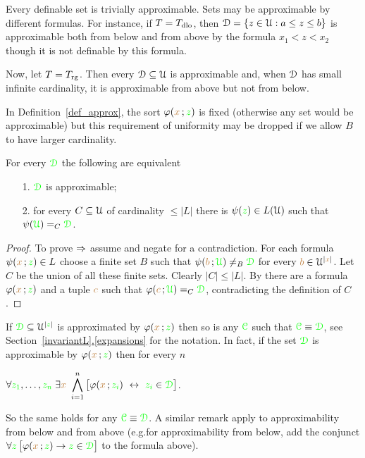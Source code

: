 \documentclass[creche.tex]{subfiles}
\begin{document}
\begin{example}
Every definable set is trivially approximable.
Sets may be approximable by different formulas.
For instance, if $T=T_{\rm dlo}$, then $\EuScript D=\{z\in\EuScript U:a\le z\le b\}$ is approximable both from below and from above by the formula $x_1<z<x_2$ though it is not definable by this formula.

Now, let $T=T_{\rm rg}$.
Then every $\EuScript D\subseteq\EuScript U$ is approximable and, when $\EuScript D$ has small infinite cardinality, it is approximable from above but not from below.\QED
\end{example}

In Definition~\ref{def_approx}, the sort $\varphi({\color{brown} x}\,;{\color{green} z})$ is fixed (otherwise any set would be approximable) but this requirement of uniformity may be dropped if we allow $B$ to have larger cardinality.

\begin{proposition}\label{lem_approx_nonunif}
For every ${\color{green}\EuScript D}$ the following are equivalent
\begin{itemize}
\item[1.] ${\color{green}\EuScript D}$ is approximable;
\item[2.] for every $C\subseteq\EuScript U$ of cardinality $\le|L|$ there is $\psi({\color{green} z})\in L(\EuScript U)$ such that $\psi({\color{green}\EuScript U})=_C{\color{green}\EuScript D}$.
\end{itemize}
\end{proposition}

\begin{proof}
To prove $\Rightarrow$ assume  and negate  for a contradiction.
For each formula $\psi({\color{brown} x}\,;{\color{green} z})\in L$ choose a finite set $B$ such that $\psi({\color{brown} b}\,;{\color{green}\EuScript U})\neq_B{\color{green}\EuScript D}$ for every ${\color{brown} b}\in\EuScript U^{|{\color{brown} x}|}$.
Let $C$ be the union of all these finite sets.
Clearly $|C|\le|L|$.
By  there are a formula $\varphi({\color{brown} x}\,;{\color{green} z})$ and a tuple ${\color{brown} c}$ such that $\varphi({\color{brown} c}\,;{\color{green}\EuScript U})=_C{\color{green}\EuScript D}$, contradicting the definition of $C$.
\end{proof}



\begin{remark}\label{prop_approx_el_eq}
If ${\color{green}\EuScript D}\subseteq\EuScript U^{|{\color{green} z}|}$ is approximated by $\varphi({\color{brown} x}\,;{\color{green} z})$ then so is any ${\color{green}\EuScript C}$ such that ${\color{green}\EuScript C}\equiv{\color{green}\EuScript D}$, see Section~\hyperref[expansions]{\ref*{invariantL}.\ref*{expansions}} for the notation.
In fact, if the set ${\color{green}\EuScript D}$ is approximable by $\varphi({\color{brown} x}\,;{\color{green} z})$ then for every $n$

\hfil$\displaystyle\A {\gr z_1},\dots,{\gr z_n}\;\E {\mr x}\ \bigwedge^n_{i=1}\big[\phi({\mr x}\,;{\gr z_i})\ \iff\ {\gr z_i}\in{\gr \D}\big]$.


So the same holds for any ${\color{green}\EuScript C}\equiv{\color{green}\EuScript D}$.
A similar remark apply to approximability from below and from above (e.g.\@ for approximability from below, add the conjunct $\forall {\color{green}z}\,\big[\varphi({\color{brown} x}\,;{\color{green} z})\rightarrow {\color{green}z}\in{\color{green}\EuScript D}\big]$ to the formula above).\QED
\end{remark}
\end{document}
